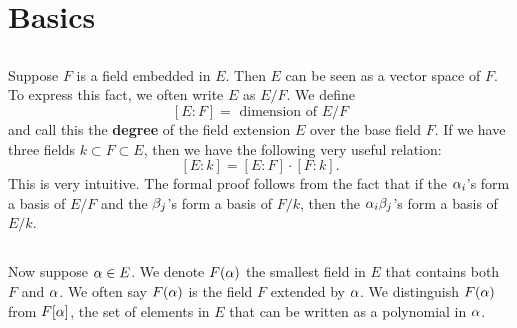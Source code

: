 \section{Basics}
\subsection{}
Suppose $F$ is a field embedded in $E$. Then $E$ can be seen as a vector space of $F$. To express this fact, we often write $E$ as $E/F$. We define
\[
    [E : F] = \text{ dimension of } E/F
\]
and call this the \textbf{degree} of the field extension $E$ over the base field $F$. If we have three fields $k \subset F \subset E$, then we have the following very useful relation:
\[
    [E : k] = [E : F] \cdot [F : k].
\]
This is very intuitive. The formal proof follows from the fact that if the $\alpha_i$'s form a basis of $E/F$ and the $\beta_j$'s form a basis of $F/k$, then the $\alpha_i\beta_j$'s form a basis of $E/k$.

\subsection{}
Now suppose $\alpha \in E$. We denote $F(\alpha)$ the smallest field in $E$ that contains both $F$ and $\alpha$. We often say $F(\alpha)$ is the field $F$ extended by $\alpha$. We distinguish $F(\alpha)$ from $F[\alpha]$, the set of elements in $E$ that can be written as a polynomial in $\alpha$.
